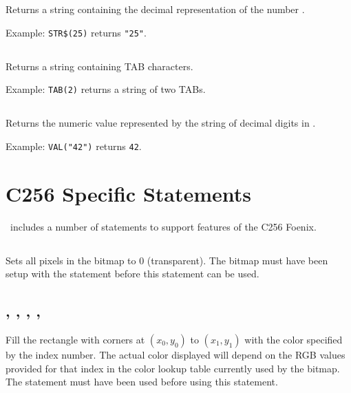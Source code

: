 \documentclass{report}
\begin{document}
    Returns a string containing the decimal representation of the number .
    
    Example: \verb+STR$(25)+ returns \verb+"25"+.

    \subsection*{}

    Returns a string containing  TAB characters.
    
    Example: \verb+TAB(2)+ returns a string of two TABs.

    \subsection*{}

    Returns the numeric value represented by the string of decimal digits in .
    
    Example: \verb+VAL("42")+ returns \verb+42+.

    \section*{C256 Specific Statements}

    \BASIC\ includes a number of statements to support features of the C256 Foenix.

    \subsection*{}

    Sets all pixels in the bitmap to 0 (transparent).
    The bitmap must have been setup with the  statement before
    this statement can be used.

    \subsection*{ , , , , }

    Fill the rectangle with corners at $(x_0, y_0)$ to $(x_1, y_1)$ with the color
    specified by the  index number.
    The actual color displayed will depend on the RGB values provided for
    that index in the color lookup table currently used by the bitmap.
    The  statement must have been used before using
    this statement.
\end{document}
